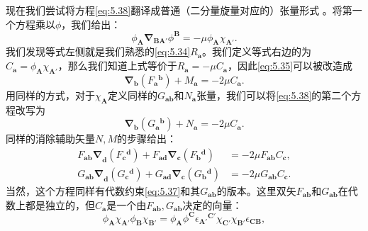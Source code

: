 现在我们尝试将方程\ref{eq:5.38}翻译成普通（二分量旋量对应的）张量形式 。将第一个方程乘以$\phi $，我们给出：
\begin{equation*}
	\phi _{\boldsymbol{A}}\boldsymbol{\nabla }_{\boldsymbol{BA} '} \phi ^{\boldsymbol{B}} =-\mu \phi _{\boldsymbol{A}} \chi _{\boldsymbol{A} '} .
\end{equation*}
我们发现等式左侧就是我们熟悉的\ref{eq:5.34}$R_{\boldsymbol{a}}$。我们定义等式右边的为$C_{\boldsymbol{a}} =\phi _{\boldsymbol{A}} \chi _{\boldsymbol{A} '}$，那么我们知道上式等价于$R_{\boldsymbol{a}} =-\mu C_{\boldsymbol{a}}$，因此\ref{eq:5.35}可以被改造成
\begin{equation*}
	\boldsymbol{\nabla }_{\boldsymbol{b}} (F{_{\boldsymbol{a}}}^{\boldsymbol{b}} )+M_{\boldsymbol{a}} =-2\mu C_{\boldsymbol{a}} .
\end{equation*}
用同样的方式，对于$\chi _{\boldsymbol{A}}$定义同样的$G_{\boldsymbol{ab}}$和$N_{\boldsymbol{a}}$张量，我们可以将\ref{eq:5.38}的第二个方程改写为
\begin{equation*}
	\boldsymbol{\nabla }_{\boldsymbol{b}} (G{_{\boldsymbol{a}}}^{\boldsymbol{b}} )+N_{\boldsymbol{a}} =-2\mu C_{\boldsymbol{a}} .
\end{equation*}
同样的消除辅助矢量$N,M$的步骤给出：
\begin{equation}
	\begin{aligned}
		F\boldsymbol{_{\boldsymbol{ab}} \nabla }_{\boldsymbol{d}} (F{_{\boldsymbol{c}}}^{\boldsymbol{d}} )+F_{\boldsymbol{ad}}\boldsymbol{\nabla }_{\boldsymbol{c}} (F{_{\boldsymbol{b}}}^{\boldsymbol{d}} ) & =-2\mu F_{\boldsymbol{ab}} C_{\boldsymbol{c}} ,\\
		G\boldsymbol{_{\boldsymbol{ab}} \nabla }_{\boldsymbol{d}} (G{_{\boldsymbol{c}}}^{\boldsymbol{d}} )+G_{\boldsymbol{ad}}\boldsymbol{\nabla }_{\boldsymbol{c}} (G{_{\boldsymbol{b}}}^{\boldsymbol{d}} ) & =-2\mu G_{\boldsymbol{ab}} C_{\boldsymbol{c}} .
	\end{aligned}
	\label{eq:5.40}
\end{equation}
当然，这个方程同样有代数约束\ref{eq:5.37}和其$G_{\boldsymbol{ab}}$的版本。这里双矢$F_{\boldsymbol{ab}}$和$G_{\boldsymbol{ab}}$在代数上都是独立的，但$C_{\boldsymbol{a}}$是一个由$F_{\boldsymbol{ab}} ,G_{\boldsymbol{ab}}$决定的向量：
\begin{equation*}
	\phi _{\boldsymbol{A}} \chi _{\boldsymbol{A} '} \phi _{\boldsymbol{B}} \chi _{\boldsymbol{B} '} =\phi _{\boldsymbol{A}} \phi ^{\boldsymbol{C}} \epsilon {_{\boldsymbol{A} '}}^{\boldsymbol{C} '} \chi _{\boldsymbol{C} '} \chi _{\boldsymbol{B} '} \epsilon _{\boldsymbol{CB}} ,
\end{equation*}
